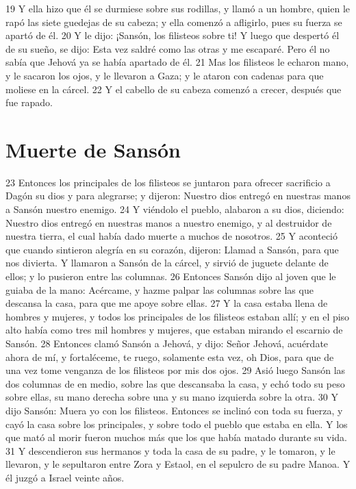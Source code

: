 19 Y ella hizo que él se durmiese sobre sus rodillas, y llamó a un hombre, quien le rapó las siete guedejas de su cabeza; y ella comenzó a afligirlo, pues su fuerza se apartó de él.
20 Y le dijo: ¡Sansón, los filisteos sobre ti! Y luego que despertó él de su sueño, se dijo: Esta vez saldré como las otras y me escaparé. Pero él no sabía que Jehová ya se había apartado de él.
21 Mas los filisteos le echaron mano, y le sacaron los ojos, y le llevaron a Gaza; y le ataron con cadenas para que moliese en la cárcel.
22 Y el cabello de su cabeza comenzó a crecer, después que fue rapado.

\section*{Muerte de Sansón}

23 Entonces los principales de los filisteos se juntaron para ofrecer sacrificio a Dagón su dios y para alegrarse; y dijeron: Nuestro dios entregó en nuestras manos a Sansón nuestro enemigo.
24 Y viéndolo el pueblo, alabaron a su dios, diciendo: Nuestro dios entregó en nuestras manos a nuestro enemigo, y al destruidor de nuestra tierra, el cual había dado muerte a muchos de nosotros. 
25 Y aconteció que cuando sintieron alegría en su corazón, dijeron: Llamad a Sansón, para que nos divierta. Y llamaron a Sansón de la cárcel, y sirvió de juguete delante de ellos; y lo pusieron entre las columnas.
26 Entonces Sansón dijo al joven que le guiaba de la mano: Acércame, y hazme palpar las columnas sobre las que descansa la casa, para que me apoye sobre ellas.
27 Y la casa estaba llena de hombres y mujeres, y todos los principales de los filisteos estaban allí; y en el piso alto había como tres mil hombres y mujeres, que estaban mirando el escarnio de Sansón.
28 Entonces clamó Sansón a Jehová, y dijo: Señor Jehová, acuérdate ahora de mí, y fortaléceme, te ruego, solamente esta vez, oh Dios, para que de una vez tome venganza de los filisteos por mis dos ojos.
29 Asió luego Sansón las dos columnas de en medio, sobre las que descansaba la casa, y echó todo su peso sobre ellas, su mano derecha sobre una y su mano izquierda sobre la otra.
30 Y dijo Sansón: Muera yo con los filisteos. Entonces se inclinó con toda su fuerza, y cayó la casa sobre los principales, y sobre todo el pueblo que estaba en ella. Y los que mató al morir fueron muchos más que los que había matado durante su vida.
31 Y descendieron sus hermanos y toda la casa de su padre, y le tomaron, y le llevaron, y le sepultaron entre Zora y Estaol, en el sepulcro de su padre Manoa. Y él juzgó a Israel veinte años.

